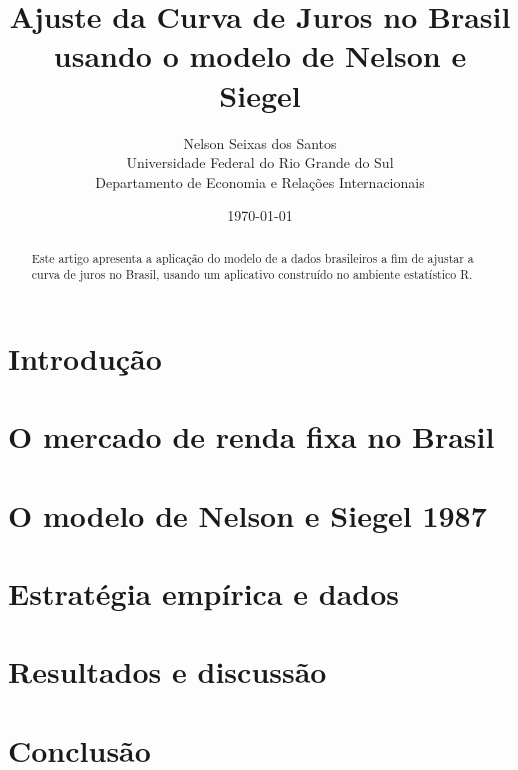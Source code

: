 \documentclass[a4paper, 11pt]{article}
\title{Ajuste da Curva de Juros no Brasil usando o modelo de Nelson e Siegel}
\author{Nelson Seixas dos Santos\\Universidade Federal do Rio Grande do Sul\\Departamento de Economia e Relações Internacionais}
\date{\today}
\begin{document}
\maketitle

\begin{abstract}
Este artigo apresenta a aplicação do modelo de \citet{nelsonsiegel1987} a dados brasileiros a fim de ajustar a curva de juros no Brasil, usando um aplicativo construído no ambiente estatístico R.
\end{abstract}


\section{Introdução}



\section{O mercado de renda fixa no Brasil}

\section{O modelo de Nelson e Siegel 1987}

\section{Estratégia empírica e dados}


\section{Resultados e discussão}




\section{Conclusão}







%

\end{document}
